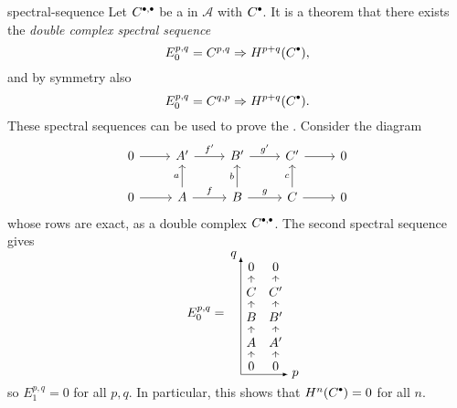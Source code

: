 \begin{example}{spectral-sequence}
    Let $C^{\bdot, \bdot}$ be a  in $\mathcal{A}$ with  $C^\bdot$. It is a theorem that there exists the \textit{double complex spectral sequence}
    \[ E_0^{p, q} = C^{p, q} \Rightarrow H^{p + q}(C^\bdot) , \]
    and by symmetry also
    \[ E_0^{p, q} = C^{q, p} \Rightarrow H^{p + q}(C^\bdot) . \]
    These spectral sequences can be used to prove the . Consider the diagram
    \[ \svg \begin{tikzcd}
        0 \arrow{r} & A' \arrow{r}{f'} & B' \arrow{r}{g'} & C' \arrow{r} & 0 \\
        0 \arrow{r} & A \arrow{r}{f} \arrow{u}{a} & B \arrow{r}{g} \arrow{u}{b} & C \arrow{r} \arrow{u}{c} & 0
    \end{tikzcd} \]
    whose rows are exact, as a double complex $C^{\bdot, \bdot}$. The second spectral sequence gives
    \[ \svg E_0^{p, q} = \quad \begin{tikzcd}[row sep=0.5em, column sep=0.1em]
        0 & 0 \\
        C \arrow{u} & C' \arrow{u} \\
        B \arrow{u} & B' \arrow{u} \\
        A \arrow{u} & A' \arrow{u} \\
        0 \arrow{u} & 0 \arrow{u}
    \end{tikzcd} \begin{tikzpicture}[overlay,remember picture]
        \draw[-latex] (-1.3, -1.6) -- (-1.3, 1.65);
        \draw[-latex] (-1.3, -1.6) -- (0, -1.6);
        \node at (0.2, -1.6) {$p$};
        \node at (-1.5, 1.7) {$q$};
    \end{tikzpicture} \]
    so $E_1^{p, q} = 0$ for all $p, q$. In particular, this shows that $H^n(C^\bdot) = 0$ for all $n$.
    

\end{example}
